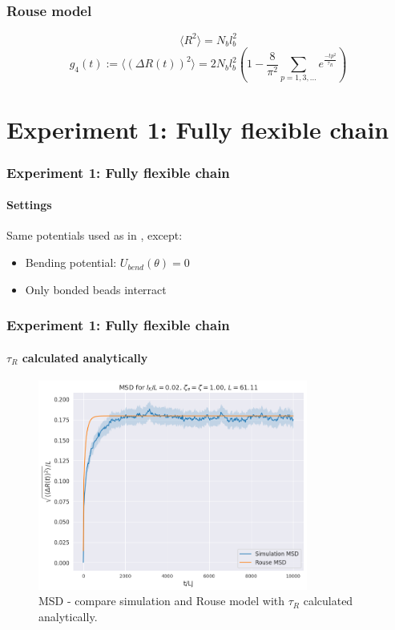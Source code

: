 \documentclass[handout]{beamer}
\newcommand{\mean}[1]{\langle #1 \rangle}
\begin{document}
\begin{frame}
    \frametitle{Rouse model}
    \begin{equation}
        \mean{R^2}=N_b l_b^2
    \end{equation}
    \begin{equation}
        g_4(t) := \mean{(\Delta R(t))^2} = 2 N_b l_b^2 (1-\frac{8}{\pi^2}\sum_{p=1,3,...}e^{\frac{-t p^2}{\tau_R}})
    \end{equation}

\end{frame}

\section{Experiment 1: Fully flexible chain}


\begin{frame}
    \frametitle{Experiment 1: Fully flexible chain}
    \framesubtitle{Settings}
    Same potentials used as in \cite[Section 2.1]{svaneborg_2020}, except:
    \begin{itemize}
        \item Bending potential: $U_{bend}(\theta)=0$
        \item Only bonded beads interract
    \end{itemize}
\end{frame}


\begin{frame}
    \frametitle{Experiment 1: Fully flexible chain}
    \framesubtitle{$\tau_R$ calculated analytically}

    \begin{figure}[h]
        \includegraphics[trim={0.1cm 0.1cm 0.1cm 1cm},clip,height=6.9cm]{./3-exp-fixed-param.png}
        \caption{MSD - compare simulation and Rouse model with $\tau_R$ calculated analytically.}
        \label{fig:full-flex-chain-fixed}
    \end{figure}
\end{frame}
\end{document}
